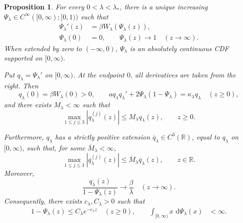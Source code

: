 \documentclass[12pt,preprint]{amsart}
\numberwithin{equation}{section}
\theoremstyle{plain}
\newtheorem{proposition}[theorem]{Proposition}
\theoremstyle{definition}
\newcommand{\dd}{\,\mathrm d}
\begin{document}
\begin{proposition}
\label{prop:hard-edge-distribution}
For every $0<\lambda<\lambda_*$, there is a unique increasing
$\Psi_\lambda\in C^\infty([0,\infty);[0,1))$ such that
\begin{equation}
\begin{aligned}
 \Psi_\lambda'(z)&=\beta W_\lambda(\Psi_\lambda(z)),\\
 \Psi_\lambda(0)&=0,\qquad
 \Psi_\lambda(z)\longrightarrow1
 \quad(z\to\infty).
\end{aligned}
 \label{eq:Psi-subcritical-definition}
\end{equation}
When extended by zero to $(-\infty,0)$, $\Psi_{\lambda}$ is an absolutely continuous CDF supported on
$[0,\infty)$.

Put $q_\lambda=\Psi_\lambda'$ on $[0,\infty)$. At the endpoint $0$,
all derivatives are taken from the right.  Then
\begin{equation}
 q_\lambda(0)=\beta W_\lambda(0)>0,
 \qquad
 a q_\lambda q_\lambda'
 +2\Psi_\lambda(1-\Psi_\lambda)
 =\kappa_\lambda q_\lambda
 \quad(z\ge0),
 \label{eq:lower-profile-equation}
\end{equation}
and there exists $M_\lambda<\infty$ such that
\begin{equation}
 \max_{1\le j\le3}|q_\lambda^{(j)}(z)|
 \le M_\lambda q_\lambda(z),
 \qquad z\ge0.
 \label{eq:subcritical-relative-bounds}
\end{equation}

Furthermore, $q_\lambda$ has a strictly positive extension
$\overline q_\lambda\in C^3(\mathbb R)$, equal to $q_\lambda$ on
$[0,\infty)$, such that, for some $\overline M_\lambda<\infty$,
\begin{equation}
 \max_{1\le j\le3}|\overline q_\lambda^{(j)}(z)|
 \le \overline M_\lambda\overline q_\lambda(z),
 \qquad z\in\mathbb R.
 \label{eq:q-extension-bounds}
\end{equation}
Moreover,
\begin{equation}
 \frac{q_\lambda(z)}{1-\Psi_\lambda(z)}
 \longrightarrow\frac\beta\lambda
 \quad(z\to\infty).
 \label{eq:subcritical-right-tail}
\end{equation}
Consequently, there exists $c_\lambda,C_\lambda>0$ such that
\[
\begin{aligned}
 1-\Psi_\lambda(z)\le C_\lambda e^{-c_\lambda z}
 \quad(z\ge0),\qquad
 \int_{[0,\infty)}x\,\dd\Psi_\lambda(x)&<\infty.
\end{aligned}
\]

\end{proposition}
\end{document}
